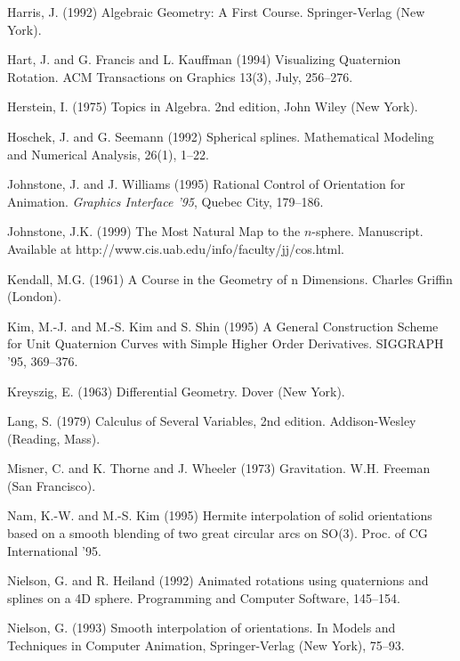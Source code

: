 \documentclass[11pt]{article}
\begin{document}
\begin{thebibliography}{99}
Harris, J. (1992)
Algebraic Geometry: A First Course.
Springer-Verlag (New York).

Hart, J. and G. Francis and L. Kauffman (1994)
Visualizing Quaternion Rotation.
ACM Transactions on Graphics 13(3), July, 256--276.

Herstein, I. (1975) Topics in Algebra.
2nd edition, John Wiley (New York).

Hoschek, J. and G. Seemann (1992)
Spherical splines.
Mathematical Modeling and Numerical Analysis, 26(1), 1--22.

Johnstone, J. and J. Williams (1995)
Rational Control of Orientation for Animation.
{\em Graphics Interface '95}, Quebec City, 179--186.

Johnstone, J.K. (1999)
The Most Natural Map to the $n$-sphere.
Manuscript.
Available at http://www.cis.uab.edu/info/faculty/jj/cos.html.

Kendall, M.G. (1961)
A Course in the Geometry of n Dimensions.
Charles Griffin (London).

Kim, M.-J. and M.-S. Kim and S. Shin (1995)
A General Construction Scheme for Unit Quaternion Curves
with Simple Higher Order Derivatives.
SIGGRAPH '95, 369--376.

Kreyszig, E. (1963)
Differential Geometry.
Dover (New York).

Lang, S. (1979)
Calculus of Several Variables, 2nd edition.
Addison-Wesley (Reading, Mass).

Misner, C. and K. Thorne and J. Wheeler (1973)
Gravitation.
W.H. Freeman (San Francisco).

Nam, K.-W. and M.-S. Kim (1995)
Hermite interpolation of solid orientations based on a smooth blending
of two great circular arcs on SO(3).
Proc. of CG International '95.

Nielson, G. and R. Heiland (1992)
Animated rotations using quaternions and splines on a 4D sphere.
Programming and Computer Software, 145--154.

Nielson, G. (1993)
Smooth interpolation of orientations.
In Models and Techniques in Computer Animation, Springer-Verlag (New York),
75--93.


\end{thebibliography}
\end{document}

